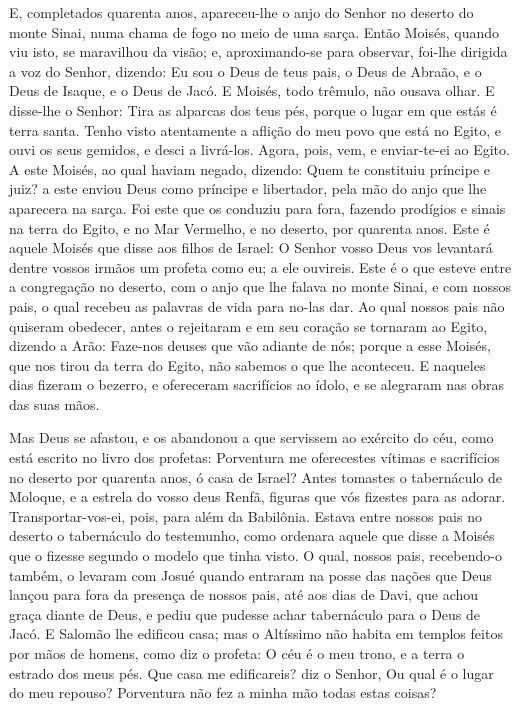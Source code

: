 E, completados quarenta anos, apareceu-lhe o anjo do Senhor no
deserto do monte Sinai, numa chama de fogo no meio de uma sarça.
Então Moisés, quando viu isto, se maravilhou da visão; e,
aproximando-se para observar, foi-lhe dirigida a voz do Senhor,
dizendo: Eu sou o Deus de teus pais, o Deus de Abraão, e o
Deus de Isaque, e o Deus de Jacó. E Moisés, todo trêmulo, não ousava
olhar. E disse-lhe o Senhor: Tira as alparcas dos teus pés,
porque o lugar em que estás é terra santa. Tenho visto
atentamente a aflição do meu povo que está no Egito, e ouvi os seus
gemidos, e desci a livrá-los. Agora, pois, vem, e enviar-te-ei ao
Egito. A este Moisés, ao qual haviam negado, dizendo: Quem te
constituiu príncipe e juiz? a este enviou Deus como príncipe e
libertador, pela mão do anjo que lhe aparecera na sarça. Foi
este que os conduziu para fora, fazendo prodígios e sinais na terra
do Egito, e no Mar Vermelho, e no deserto, por quarenta anos.
Este é aquele Moisés que disse aos filhos de Israel: O Senhor
vosso Deus vos levantará dentre vossos irmãos um profeta como eu; a
ele ouvireis. Este é o que esteve entre a congregação no
deserto, com o anjo que lhe falava no monte Sinai, e com nossos
pais, o qual recebeu as palavras de vida para no-las dar. Ao
qual nossos pais não quiseram obedecer, antes o rejeitaram e em seu
coração se tornaram ao Egito, dizendo a Arão: Faze-nos deuses
que vão adiante de nós; porque a esse Moisés, que nos tirou da terra
do Egito, não sabemos o que lhe aconteceu. E naqueles dias
fizeram o bezerro, e ofereceram sacrifícios ao ídolo, e se alegraram
nas obras das suas mãos.

Mas Deus se afastou, e os abandonou a que servissem ao exército
do céu, como está escrito no livro dos profetas: Porventura me
oferecestes vítimas e sacrifícios no deserto por quarenta anos, ó
casa de Israel? Antes tomastes o tabernáculo de Moloque, e a
estrela do vosso deus Renfã, figuras que vós fizestes para as
adorar. Transportar-vos-ei, pois, para além da Babilônia.
Estava entre nossos pais no deserto o tabernáculo do
testemunho, como ordenara aquele que disse a Moisés que o fizesse
segundo o modelo que tinha visto. O qual, nossos pais,
recebendo-o também, o levaram com Josué quando entraram na posse das
nações que Deus lançou para fora da presença de nossos pais, até aos
dias de Davi, que achou graça diante de Deus, e pediu que
pudesse achar tabernáculo para o Deus de Jacó. E Salomão lhe
edificou casa; mas o Altíssimo não habita em templos feitos
por mãos de homens, como diz o profeta: O céu é o meu trono,
e a terra o estrado dos meus pés. Que casa me edificareis? diz o
Senhor, Ou qual é o lugar do meu repouso? Porventura não fez
a minha mão todas estas coisas?

